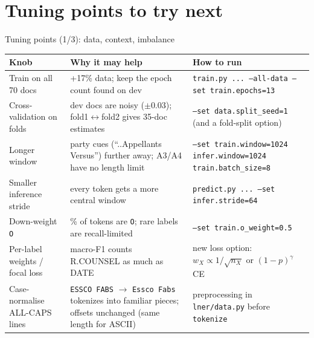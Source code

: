 \documentclass[aspectratio=169,11pt]{beamer}
\newcommand{\code}[1]{\texttt{\small #1}}
\begin{document}
\section{Tuning points to try next}

\begin{frame}{Tuning points (1/3): data, context, imbalance}
  \footnotesize
  \begin{tabularx}{\textwidth}{@{}>{\raggedright\arraybackslash}p{3.3cm}>{\raggedright\arraybackslash}X>{\raggedright\arraybackslash}p{5.6cm}@{}}
    \toprule
    Knob & Why it may help & How to run \\
    \midrule
    Train on all 70 docs & +17\% data; keep the epoch count found on dev &
      \code{train.py ... --all-data --set train.epochs=13} \\
    Cross-validation on folds & 10 dev docs are noisy ($\pm$0.03); fold1$\leftrightarrow$fold2 gives 35-doc estimates &
      \code{--set data.split\_seed=1} (and a fold-split option) \\
    Longer window & party cues (``..Appellants Versus'') further away; A3/A4 have no length limit &
      \code{--set train.window=1024 infer.window=1024 train.batch\_size=8} \\
    Smaller inference stride & every token gets a more central window &
      \code{predict.py ... --set infer.stride=64} \\
    Down-weight \code{O} & 91\% of tokens are \code{O}; rare labels are recall-limited &
      \code{--set train.o\_weight=0.5} \\
    Per-label weights / focal loss & macro-F1 counts R.COUNSEL as much as DATE &
      new loss option: $w_X \propto 1/\sqrt{n_X}$ or $(1-p)^\gamma$ CE \\
    Case-normalise ALL-CAPS lines & \code{ESSCO FABS} $\to$ \code{Essco Fabs} tokenizes into familiar pieces; offsets unchanged (same length for ASCII) &
      preprocessing in \code{lner/data.py} before \code{tokenize} \\
    \bottomrule
  \end{tabularx}
\end{frame}
\end{document}
